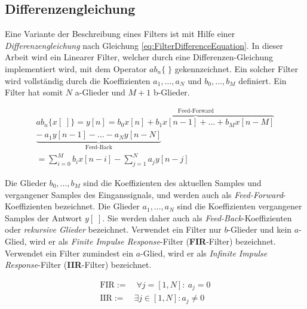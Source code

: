 \subsection{Differenzengleichung}
\label{sec:differenzengleichung}

Eine Variante der Beschreibung eines Filters ist mit Hilfe einer \emph{Differenzengleichung} nach Gleichung \ref{eq:FilterDifferenceEquation}. In dieser Arbeit wird ein Linearer Filter, welcher durch eine Differenzen-Gleichung implementiert wird, mit dem Operator $ab_n\{\;\}$ gekennzeichnet. Ein solcher Filter wird vollständig durch die Koeffizienten $a_1 ,\ldots, a_N$ und $b_0 ,\ldots, b_M$  definiert. Ein Filter hat somit $N$ a-Glieder und $M+1$ b-Glieder.  \cite[\glqq Difference Equation\grqq]{introductionToFilters}

 \begin{equation}
\begin{split}
ab_n\{x[\;]\}= y[n] = \overbrace{b_0 x[n] + b_1 x[n-1] + \ldots +b_M x[n-M]}^\text{Feed-Forward} \\
\underbrace{-\ a_1 y[n-1] - \ldots - a_N y[n-N]}_\text{Feed-Back} \\
 = \sum_{i=0}^{M} b_i x[n-i] - \sum_{j=1}^{N} a_j y[n-j]
\end{split}
\label{eq:FilterDifferenceEquation}
\end{equation}

Die Glieder $b_0 ,\ldots, b_M$ sind die Koeffizienten des aktuellen Samples und vergangener Samples des Einganssignals, und werden auch als \emph{Feed-Forward}-Koeffizienten bezeichnet. Die Glieder $a_1 ,\ldots, a_N$ sind die Koeffizienten vergangener Samples der Antwort $y[\;]$. Sie werden daher auch als \emph{Feed-Back}-Koeffizienten oder \emph{rekursive Glieder} bezeichnet. Verwendet ein Filter nur $b$-Glieder und kein $a$-Glied, wird er als \emph{Finite Impulse Response}-Filter (\textbf{FIR}-Filter) bezeichnet. Verwendet ein Filter zumindest ein $a$-Glied, wird er als \emph{Infinite Impulse Response}-Filter (\textbf{IIR}-Filter) bezeichnet.\cite[\glqq Difference Equation\grqq]{introductionToFilters}

 \begin{equation}
\begin{gathered}
\text{FIR} := \quad \forall j = [1,N] :\ a_j = 0 \\
\text{IIR} := \quad \exists j \in [1,N]:  a_j \neq 0
\end{gathered}
\label{eq:FilterDifferenceEquation}
\end{equation}

